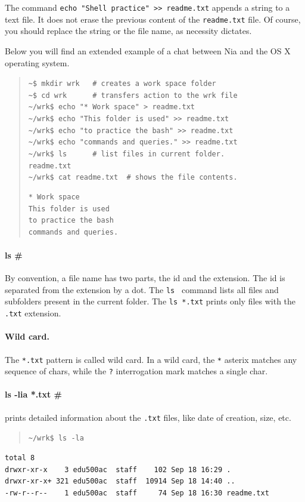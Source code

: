 \documentclass[a4paper,12pt,openany]{book}
\begin{document}
The command \verb|echo "Shell practice" >> readme.txt|
appends a string to a text file. It does
not erase the previous content of
the \verb|readme.txt| file. Of course,
you should replace the string or the
file name, as necessity dictates.


Below you will find
an extended example of a chat between Nia and
the OS X operating system.
\begin{quote}
\verb|~$ mkdir wrk   # creates a work space folder      | \\
\verb|~$ cd wrk      # transfers action to the wrk file | \\
\verb|~/wrk$ echo "* Work space" > readme.txt | \\
\verb|~/wrk$ echo "This folder is used" >> readme.txt |\\
\verb|~/wrk$ echo "to practice the bash" >> readme.txt | \\
\verb|~/wrk$ echo "commands and queries." >> readme.txt | \\
\verb|~/wrk$ ls      # list files in current folder. | \\
\verb|readme.txt |\\
\verb|~/wrk$ cat readme.txt  # shows the file contents.| 
\begin{verbatim}
* Work space
This folder is used
to practice the bash
commands and queries.
\end{verbatim}
\end{quote}

\paragraph{ls \#} 
By convention, a file name has
two parts, the id and the extension. The id
is separated from the extension by a dot.
The \verb|ls | command lists all files
and subfolders present in the current folder.
The \verb|ls *.txt| prints only files
with the \verb|.txt| extension.

\paragraph{Wild card.} The 
\verb|*.txt| pattern
is called wild card.
In a wild card, the \verb|*| asterix matches
any sequence of chars, while the \verb|?|
interrogation mark matches a single char.

\paragraph{ls -lia *.txt \#} prints detailed
information about the \verb|.txt| files,
like date of creation, size, etc.
\begin{quote}
\verb|~/wrk$ ls -la |  
\end{quote}
\begin{verbatim}
total 8
drwxr-xr-x    3 edu500ac  staff    102 Sep 18 16:29 .
drwxr-xr-x+ 321 edu500ac  staff  10914 Sep 18 14:40 ..
-rw-r--r--    1 edu500ac  staff     74 Sep 18 16:30 readme.txt
\end{verbatim}
\end{document}
